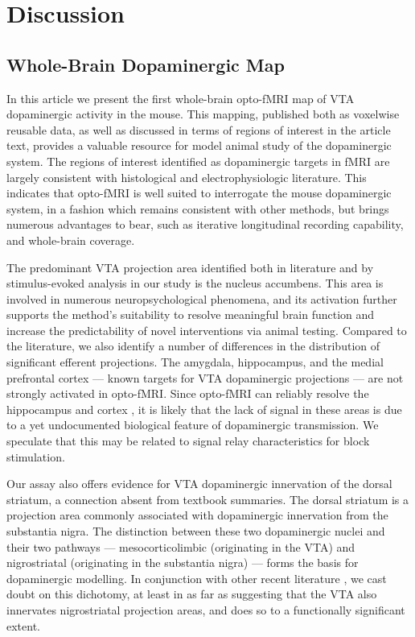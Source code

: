\section{Discussion}

\subsection{Whole-Brain Dopaminergic Map}

In this article we present the first whole-brain opto-fMRI map of VTA dopaminergic activity in the mouse.
This mapping, published both as voxelwise reusable data, as well as discussed in terms of regions of interest in the article text, provides a valuable resource for model animal study of the dopaminergic system.
The regions of interest identified as dopaminergic targets in fMRI are largely consistent with histological and electrophysiologic literature.
This indicates that opto-fMRI is well suited to interrogate the mouse dopaminergic system, in a fashion which remains consistent with other methods, but brings numerous advantages to bear, such as iterative longitudinal recording capability, and whole-brain coverage.

The predominant VTA projection area identified both in literature and by stimulus-evoked analysis in our study is the nucleus accumbens.
This area is involved in numerous neuropsychological phenomena, and its activation further supports the method's suitability to resolve meaningful brain function and increase the predictability of novel interventions via animal testing.
Compared to the literature, we also identify a number of differences in the distribution of significant efferent projections.
The amygdala, hippocampus, and the medial prefrontal cortex --- known targets for VTA dopaminergic projections --- are not strongly activated in opto-fMRI.
Since opto-fMRI can reliably resolve the hippocampus and cortex \cite{Lebhardt2015,Grandjean2019}, it is likely that the lack of signal in these areas is due to a yet undocumented biological feature of dopaminergic transmission.
We speculate that this may be related to signal relay characteristics for block stimulation.

Our assay also offers evidence for VTA dopaminergic innervation of the dorsal striatum, a connection absent from textbook summaries.
The dorsal striatum is a projection area commonly associated with dopaminergic innervation from the substantia nigra.
The distinction between these two dopaminergic nuclei and their two pathways --- mesocorticolimbic (originating in the VTA) and nigrostriatal (originating in the substantia nigra) --- forms the basis for dopaminergic modelling.
In conjunction with other recent literature \cite{Lohani2016,Pan2010}, we cast doubt on this dichotomy, at least in as far as suggesting that the VTA also innervates nigrostriatal projection areas, and does so to a functionally significant extent.

